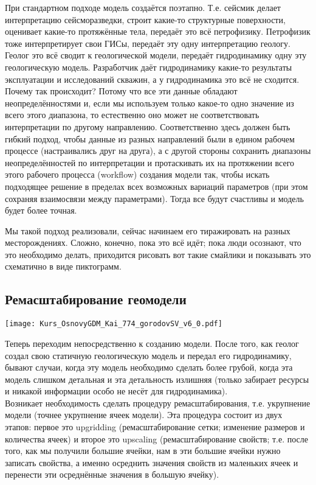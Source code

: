 \documentclass[main.tex]{subfiles}
\begin{document}
При стандартном подходе модель создаётся поэтапно. Т.е. сейсмик делает интерпретацию сейсморазведки, строит какие-то структурные поверхности, оценивает какие-то протяжённые тела, передаёт это всё петрофизику.
Петрофизик тоже интерпретирует свои ГИСы, передаёт эту одну интерпретацию геологу.
Геолог это всё сводит к геологической модели, передаёт гидродинамику одну эту геологическую модель.
Разработчик даёт гидродинамику какие-то результаты эксплуатации и исследований скважин, а у гидродинамика это всё не сходится.
Почему так происходит? Потому что все эти данные обладают неопределённостями и, если мы используем только какое-то одно значение из всего этого диапазона, то естественно оно может не соответствовать интерпретации по другому направлению.
Соответственно здесь должен быть гибкий подход, чтобы данные из разных направлений были в едином рабочем процессе (настраивались друг на друга), а с другой стороны сохранить диапазоны неопределённостей по интерпретации и протаскивать их на протяжении всего этого рабочего процесса (workflow) создания модели так, чтобы искать подходящее решение в пределах всех возможных вариаций параметров (при этом сохраняя взаимосвязи между параметрами).
Тогда все будут счастливы и модель будет более точная.

Мы такой подход реализовали, сейчас начинаем его тиражировать на разных месторождениях.
Сложно, конечно, пока это всё идёт; пока люди осознают, что это необходимо делать, приходится рисовать вот такие смайлики и показывать это схематично в виде пиктограмм. 

\subsection{Ремасштабирование геомодели}

\texttt{[image: Kurs\_OsnovyGDM\_Kai\_774\_gorodovSV\_v6\_0.pdf]}

Теперь переходим непосредственно к созданию модели.
После того, как геолог создал свою статичную геологическую модель и передал его гидродинамику, бывают случаи, когда эту модель необходимо сделать более грубой, когда эта модель слишком детальная и эта детальность излишняя (только забирает ресурсы и никакой информации особо не несёт для гидродинамика).
\\

Возникает необходимость сделать процедуру ремасштабирования, т.е. укрупнение модели (точнее укрупнение ячеек модели).
Эта процедура состоит из двух этапов: первое это upgridding (ремасштабирование сетки; изменение размеров и количества ячеек) и второе это upscaling (ремасштабирование свойств; т.е. после того, как мы получили большие ячейки, нам в эти большие ячейки нужно записать свойства, а именно осреднить значения свойств из маленьких ячеек и перенести эти осреднённые значения в большую ячейку).
\\
\end{document}
